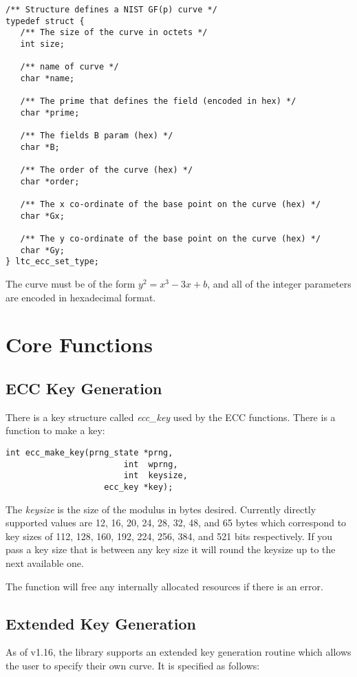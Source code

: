 \documentclass[synpaper]{book}
\newcommand{\mysection}[1]    %
	{                   %
	\section{#1}
   \markboth{\textsf{www.libtom.org}}{\thesection ~ {#1}}
	}
\begin{document}
\begin{verbatim}
/** Structure defines a NIST GF(p) curve */
typedef struct {
   /** The size of the curve in octets */
   int size;

   /** name of curve */
   char *name; 

   /** The prime that defines the field (encoded in hex) */
   char *prime;

   /** The fields B param (hex) */
   char *B;

   /** The order of the curve (hex) */
   char *order;
  
   /** The x co-ordinate of the base point on the curve (hex) */
   char *Gx;
 
   /** The y co-ordinate of the base point on the curve (hex) */
   char *Gy;
} ltc_ecc_set_type;
\end{verbatim}

The curve must be of the form $y^2 = x^3 - 3x + b$, and all of the integer parameters are encoded in hexadecimal format.

\mysection{Core Functions}
\subsection{ECC Key Generation}
There is a key structure called \textit{ecc\_key} used by the ECC functions.  There is a function to make a key:
\begin{verbatim}
int ecc_make_key(prng_state *prng, 
                        int  wprng, 
                        int  keysize, 
                    ecc_key *key);
\end{verbatim}

The \textit{keysize} is the size of the modulus in bytes desired.  Currently directly supported values are 12, 16, 20, 24, 28, 32, 48, and 65 bytes which
correspond to key sizes of 112, 128, 160, 192, 224, 256, 384, and 521 bits respectively.  If you pass a key size that is between any key size it will round 
the keysize up to the next available one.

The function will free any internally allocated resources if there is an error.

\subsection{Extended Key Generation}
As of v1.16, the library supports an extended key generation routine which allows the user to specify their own curve.  It is specified as follows:
\end{document}
